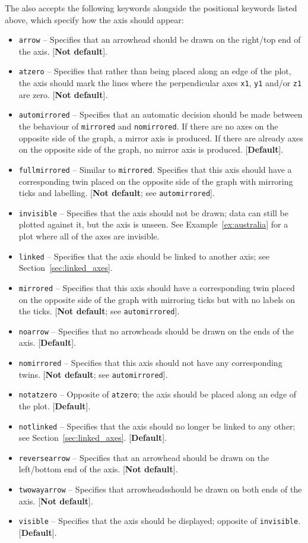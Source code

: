 The  also accepts the following keywords alongside the
positional keywords listed above, which specify how the axis should appear:
\begin{itemize}
\item {\tt arrow} -- Specifies that an arrowhead should be drawn on the right/top end of the axis. [{\bf Not default}].
\item {\tt atzero} -- Specifies that rather than being placed along an edge of the plot, the axis should mark the lines where the perpendicular axes {\tt x1}, {\tt y1} and/or {\tt z1} are zero. [{\bf Not default}].
\item {\tt automirrored} -- Specifies that an automatic decision should be made between the behaviour of {\tt mirrored} and {\tt nomirrored}. If there are no axes on the opposite side of the graph, a mirror axis is produced. If there are already axes on the opposite side of the graph, no mirror axis is produced. [{\bf Default}].
\item {\tt fullmirrored} -- Similar to {\tt mirrored}. Specifies that this axis should have a corresponding twin placed on the opposite side of the graph with mirroring ticks and labelling. [{\bf Not default}; see {\tt automirrored}].
\item {\tt invisible} -- Specifies that the axis should not be drawn; data can still be plotted against it, but the axis is unseen. See Example~\ref{ex:australia} for a plot where all of the axes are invisible.
\item {\tt linked} -- Specifies that the axis should be linked to another axis; see Section~\ref{sec:linked_axes}.
\item {\tt mirrored} -- Specifies that this axis should have a corresponding twin placed on the opposite side of the graph with mirroring ticks but with no labels on the ticks. [{\bf Not default}; see {\tt automirrored}].
\item {\tt noarrow} -- Specifies that no arrowheads should be drawn on the ends of the axis. [{\bf Default}].
\item {\tt nomirrored} -- Specifies that this axis should not have any corresponding twins. [{\bf Not default}; see {\tt automirrored}].
\item {\tt notatzero} -- Opposite of {\tt atzero}; the axis should be placed along an edge of the plot. [{\bf Default}].
\item {\tt notlinked} -- Specifies that the axis should no longer be linked to any other; see Section~\ref{sec:linked_axes}. [{\bf Default}].
\item {\tt reversearrow} -- Specifies that an arrowhead should be drawn on the left/bottom end of the axis. [{\bf Not default}].
\item {\tt twowayarrow} -- Specifies that arrowheadsshould be drawn on both ends of the axis. [{\bf Not default}].
\item {\tt visible} -- Specifies that the axis should be displayed; opposite of {\tt invisible}. [{\bf Default}].
\end{itemize}

